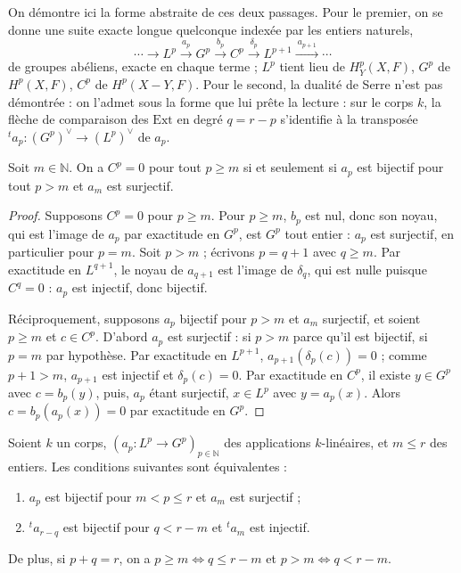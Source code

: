 On démontre ici la forme abstraite de ces deux passages. Pour le premier, on se donne une suite exacte longue quelconque indexée par les entiers naturels,
\[
  \cdots \to L^p \xrightarrow{\ a_p\ } G^p \xrightarrow{\ b_p\ } C^p \xrightarrow{\ \delta_p\ } L^{p+1} \xrightarrow{\ a_{p+1}\ } \cdots
\]
de groupes abéliens, exacte en chaque terme ; $L^p$ tient lieu de $H^p_Y(X,F)$, $G^p$ de $H^p(X,F)$, $C^p$ de $H^p(X-Y,F)$. Pour le second, la dualité de Serre n'est pas démontrée : on l'admet sous la forme que lui prête la lecture : sur le corps $k$, la flèche de comparaison des $\mathrm{Ext}$ en degré $q = r - p$ s'identifie à la transposée ${}^t a_p : (G^p)^\vee \to (L^p)^\vee$ de $a_p$.

\begin{lemme}\label{lem:125-etage12}
Soit $m \in \mathbb N$. On a $C^p = 0$ pour tout $p \geqslant m$ si et seulement si $a_p$ est bijectif pour tout $p > m$ et $a_m$ est surjectif.
\end{lemme}

\begin{proof}
Supposons $C^p = 0$ pour $p \geqslant m$. Pour $p \geqslant m$, $b_p$ est nul, donc son noyau, qui est l'image de $a_p$ par exactitude en $G^p$, est $G^p$ tout entier : $a_p$ est surjectif, en particulier pour $p = m$. Soit $p > m$ ; écrivons $p = q + 1$ avec $q \geqslant m$. Par exactitude en $L^{q+1}$, le noyau de $a_{q+1}$ est l'image de $\delta_q$, qui est nulle puisque $C^q = 0$ : $a_p$ est injectif, donc bijectif.

Réciproquement, supposons $a_p$ bijectif pour $p > m$ et $a_m$ surjectif, et soient $p \geqslant m$ et $c \in C^p$. D'abord $a_p$ est surjectif : si $p > m$ parce qu'il est bijectif, si $p = m$ par hypothèse. Par exactitude en $L^{p+1}$, $a_{p+1}(\delta_p(c)) = 0$ ; comme $p + 1 > m$, $a_{p+1}$ est injectif et $\delta_p(c) = 0$. Par exactitude en $C^p$, il existe $y \in G^p$ avec $c = b_p(y)$, puis, $a_p$ étant surjectif, $x \in L^p$ avec $y = a_p(x)$. Alors $c = b_p(a_p(x)) = 0$ par exactitude en $G^p$.
\end{proof}

\begin{lemme}\label{lem:125-etage23}
Soient $k$ un corps, $(a_p : L^p \to G^p)_{p \in \mathbb N}$ des applications $k$-linéaires, et $m \leqslant r$ des entiers. Les conditions suivantes sont équivalentes :
\begin{enumerate}
\item $a_p$ est bijectif pour $m < p \leqslant r$ et $a_m$ est surjectif ;
\item ${}^t a_{r-q}$ est bijectif pour $q < r - m$ et ${}^t a_{m}$ est injectif.
\end{enumerate}
De plus, si $p + q = r$, on a $p \geqslant m \Leftrightarrow q \leqslant r - m$ et $p > m \Leftrightarrow q < r - m$.
\end{lemme}

